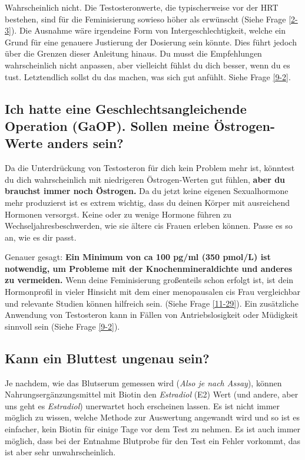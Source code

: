 \documentclass{article}
\begin{document}
Wahrscheinlich nicht. Die Testosteronwerte, die typischerweise vor der HRT bestehen, sind für die Feminisierung sowieso höher als erwünscht (Siehe Frage \ref{2-3}). Die Ausnahme wäre irgendeine Form von Intergeschlechtigkeit, welche ein Grund für eine genauere Justierung der Dosierung sein könnte. Dies führt jedoch über die Grenzen dieser Anleitung hinaus. Du musst die Empfehlungen wahrscheinlich nicht anpassen, aber vielleicht fühlst du dich besser, wenn du es tust. Letztendlich sollst du das machen, was sich gut anfühlt. Siehe Frage \ref{9-2}.

\subsection{Ich hatte eine Geschlechtsangleichende Operation (GaOP). Sollen meine Östrogen-Werte anders sein?}

Da die Unterdrückung von Testosteron für dich kein Problem mehr ist, könntest du dich wahrscheinlich mit niedrigeren Östrogen-Werten gut fühlen, \textbf{aber du brauchst immer noch Östrogen.} Da du jetzt keine eigenen Sexualhormone mehr produzierst ist es extrem wichtig, dass du deinen Körper mit ausreichend Hormonen versorgst. Keine oder zu wenige Hormone führen zu Wechseljahresbeschwerden, wie sie ältere cis Frauen erleben können. Passe es so an, wie es dir passt.

Genauer gesagt: \textbf{Ein Minimum von ca 100 pg/ml (350 pmol/L) ist notwendig, um Probleme mit der Knochenmineraldichte und anderes zu vermeiden.} Wenn deine Feminisierung großenteils schon erfolgt ist, ist dein Hormonprofil in vieler Hinsicht mit dem einer menopausalen cis Frau vergleichbar und relevante Studien können hilfreich sein. (Siehe Frage \ref{11-29}). Ein zusätzliche Anwendung von Testosteron kann in Fällen von Antriebslosigkeit oder Müdigkeit sinnvoll sein (Siehe Frage \ref{9-2}).

\subsection{Kann ein Bluttest ungenau sein?}

Je nachdem, wie das Blutserum gemessen wird (\textit{Also je nach Assay}), können Nahrungsergänzungsmittel mit Biotin den \textit{Estradiol} (E2) Wert (und andere, aber uns geht es \textit{Estradiol}) unerwartet hoch erscheinen lassen. Es ist nicht immer möglich zu wissen, welche Methode zur Auswertung angewandt wird und so ist es einfacher, kein Biotin für einige Tage vor dem Test zu nehmen. Es ist auch immer möglich, dass bei der Entnahme Blutprobe für den Test ein Fehler vorkommt, das ist aber sehr unwahrscheinlich.
\end{document}
